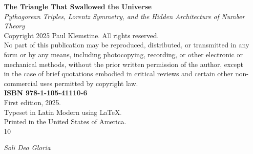 \documentclass[11pt,twoside,openright]{book}
\theoremstyle{definition}
\begin{document}
\thispagestyle{empty}
\vspace*{\fill}
\begin{flushleft}
{\small

\textbf{The Triangle That Swallowed the Universe}\\
\textit{Pythagorean Triples, Lorentz Symmetry, and the Hidden Architecture of Number Theory}\\[12pt]

Copyright \textcopyright{} 2025 Paul Klemstine. All rights reserved.\\[6pt]

No part of this publication may be reproduced, distributed, or transmitted
in any form or by any means, including photocopying, recording, or other
electronic or mechanical methods, without the prior written permission of
the author, except in the case of brief quotations embodied in critical
reviews and certain other non-commercial uses permitted by copyright law.\\[12pt]

\textbf{ISBN 978-1-105-41110-6}\\[12pt]

First edition, 2025.\\[6pt]

Typeset in Latin Modern using \LaTeX.\\[6pt]

Printed in the United States of America.\\[12pt]

10
}
\end{flushleft}
\cleardoublepage

\thispagestyle{empty}
\vspace*{3in}
\begin{center}
{\Large\textit{Soli Deo Gloria}}
\end{center}
\vfill
\cleardoublepage

\frontmatter
\tableofcontents
\cleardoublepage

\mainmatter






\end{document}
